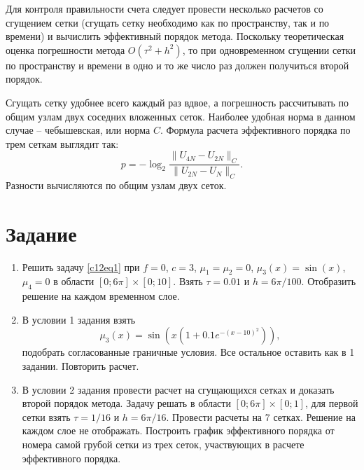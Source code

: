 Для контроля правильности счета следует провести несколько расчетов со сгущением сетки (сгущать сетку необходимо как по пространству, так и по времени) и вычислить эффективный порядок метода. Поскольку теоретическая оценка погрешности метода $O\left( \tau^2 + h^2 \right)$, то при одновременном сгущении сетки по пространству и времени в одно и то же число раз должен получиться второй порядок.

Сгущать сетку удобнее всего каждый раз вдвое, а погрешность рассчитывать  по общим узлам двух соседних вложенных сеток. Наиболее удобная норма в данном случае – чебышевская, или норма $C$. Формула расчета эффективного порядка по трем сеткам выглядит так:
\begin{equation} \label{c12eq6}
	p = - \log_2 \frac{\| U_{4N} - U_{2N} \|_C}{\| U_{2N} - U_N \|_C}.
\end{equation}
Разности вычисляются по общим узлам двух сеток.

\section{Задание}
\begin{enumerate}
\item Решить задачу \eqref{c12eq1} при $f = 0$, $c = 3$, $\mu_1 = \mu_2 = 0$, $\mu_3(x) = \sin (x)$, $\mu_4 = 0$ в области $[0; 6\pi] \times [0; 10]$. Взять $\tau = 0.01$ и $h = 6\pi/100$. Отобразить решение на каждом временном слое.
\item В условии 1 задания взять 
\begin{equation} \nonumber
	\mu_3(x) = \sin \left( x \left( 1 + 0.1 e^{-(x-10)^2}\right) \right),
\end{equation}
подобрать согласованные граничные условия. Все остальное оставить как в 1 задании. Повторить расчет.
\item В условии 2 задания провести расчет на сгущающихся сетках и доказать второй порядок метода. Задачу решать в области $[0; 6\pi] \times [0; 1]$, для первой сетки взять $\tau = 1/16$ и $h = 6\pi/16$. Провести расчеты на 7 сетках. Решение на каждом слое не отображать. Построить график эффективного порядка от номера самой грубой сетки из трех сеток, участвующих в расчете эффективного порядка.
\end{enumerate}

